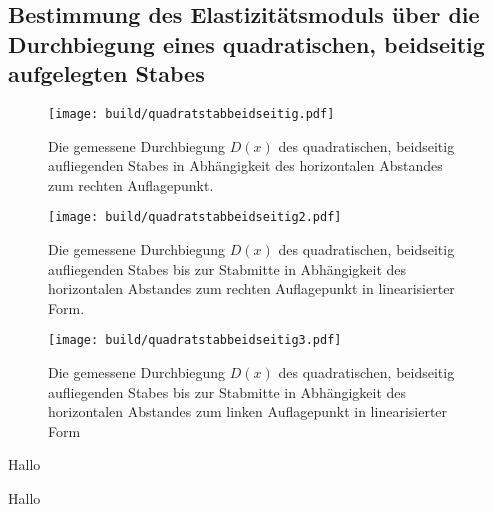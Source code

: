 \subsection{Bestimmung des Elastizitätsmoduls über die Durchbiegung eines quadratischen, beidseitig aufgelegten Stabes}
\begin{figure}
	\centering
	\caption{Die gemessene Durchbiegung $D(x)$ des quadratischen, beidseitig aufliegenden Stabes
	 in Abhängigkeit des horizontalen Abstandes zum rechten Auflagepunkt.}
	\texttt{[image: build/quadratstabbeidseitig.pdf]}
	\label{fig:grad3}
\end{figure}
\begin{figure}
	\centering
	\caption{Die gemessene Durchbiegung $D(x)$ des quadratischen, beidseitig aufliegenden Stabes bis zur Stabmitte
	 in Abhängigkeit des horizontalen Abstandes zum rechten Auflagepunkt in linearisierter Form.}
	\texttt{[image: build/quadratstabbeidseitig2.pdf]}
	\label{fig:grad3}
\end{figure}
\begin{figure}
	\centering
	\caption{Die gemessene Durchbiegung $D(x)$ des quadratischen, beidseitig aufliegenden Stabes bis zur Stabmitte
	 in Abhängigkeit des horizontalen Abstandes zum linken Auflagepunkt in linearisierter Form}
	\texttt{[image: build/quadratstabbeidseitig3.pdf]}
	\label{fig:grad3}
\end{figure}
Hallo


Hallo
